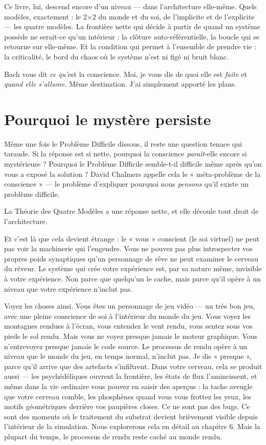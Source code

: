 \documentclass[11pt, twoside, openright]{book}
\begin{document}
Ce livre, lui, descend encore d'un niveau --- dans l'architecture elle-même. Quels modèles, exactement : le 2×2 du monde et du soi, de l'implicite et de l'explicite --- les quatre modèles. La frontière nette qui décide à partir de quand un système possède ne serait-ce qu'un intérieur : la clôture auto-référentielle, la boucle qui se retourne sur elle-même. Et la condition qui permet à l'ensemble de prendre vie : la criticalité, le bord du chaos où le système n'est ni figé ni bruit blanc.

Bach vous dit \textit{ce qu'}est la conscience. Moi, je vous dis de quoi elle est \textit{faite} et \textit{quand elle s'allume}. Même destination. J'ai simplement apporté les plans.

\section*{Pourquoi le mystère persiste}

Même une fois le Problème Difficile dissous, il reste une question tenace qui taraude. Si la réponse est si nette, pourquoi la conscience \textit{paraît}-elle encore si mystérieuse ? Pourquoi le Problème Difficile semble-t-il difficile même après qu'on vous a exposé la solution ? David Chalmers appelle cela le « méta-problème de la conscience » --- le problème d'expliquer pourquoi nous \textit{pensons} qu'il existe un problème difficile.

La Théorie des Quatre Modèles a une réponse nette, et elle découle tout droit de l'architecture.

Et c'est là que cela devient étrange : le « vous » conscient (le soi virtuel) ne peut pas voir la machinerie qui l'engendre. Vous ne pouvez pas plus introspecter vos propres poids synaptiques qu'un personnage de rêve ne peut examiner le cerveau du rêveur. Le système qui crée votre expérience est, par sa nature même, invisible à votre expérience. Non parce que quelqu'un le cache, mais parce qu'il opère à un niveau que votre expérience n'inclut pas.

Voyez les choses ainsi. Vous êtes un personnage de jeu vidéo --- un très bon jeu, avec une pleine conscience de soi à l'intérieur du monde du jeu. Vous voyez les montagnes rendues à l'écran, vous entendez le vent rendu, vous sentez sous vos pieds le sol rendu. Mais vous ne voyez presque jamais le moteur graphique. Vous n'entrevoyez presque jamais le code source. Le processus de rendu opère à un niveau que le monde du jeu, en temps normal, n'inclut pas. Je dis « presque », parce qu'il arrive que des artefacts s'infiltrent. Dans votre cerveau, cela se produit aussi --- les psychédéliques ouvrent la frontière, les états de flux l'amincissent, et même dans la vie ordinaire vous pouvez en saisir des aperçus : la tache aveugle que votre cerveau comble, les phosphènes quand vous vous frottez les yeux, les motifs géométriques derrière vos paupières closes. Ce ne sont pas des bugs. Ce sont des moments où le traitement du substrat devient brièvement visible depuis l'intérieur de la simulation. Nous explorerons cela en détail au chapitre 6. Mais la plupart du temps, le processus de rendu reste caché au monde rendu.
\end{document}
